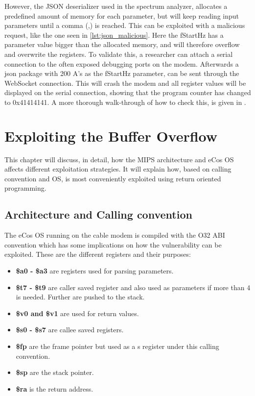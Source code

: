 However, the JSON deserializer used in the spectrum analyzer, allocates a predefined amount of memory for each parameter, but will keep reading input parameters until a comma (,) is reached.
This can be exploited with a malicious request, like the one seen in \cref{lst:json_malicious}.
Here the fStartHz has a parameter value bigger than the allocated memory, and will therefore overflow and overwrite the registers.
To validate this, a researcher can attach a serial connection to the often exposed debugging ports on the modem. 
Afterwards a json package with 200 A's as the fStartHz parameter, can be sent through the WebSocket connection.
This will crash the modem and all register values will be displayed on the serial connection, showing that the program counter has changed to 0x41414141.
A more thorough walk-through of how to check this, is given in .




\chapter{Exploiting the Buffer Overflow}
This chapter will discuss, in detail, how the MIPS architecture and eCos OS affects different exploitation strategies. It will explain how, based on calling convention and OS, \exploitname{} is most conveniently exploited using return oriented programming.

\section{Architecture and Calling convention}
The eCos OS running on the cable modem is compiled with the O32 ABI convention which has some implications on how the vulnerability can be exploited. These are the different registers and their purposes:

\begin{itemize}
    \item \textbf{\$a0 - \$a3} are registers used for parsing parameters.
    \item \textbf{\$t7 - \$t9} are caller saved register and also used as parameters if more than 4 is needed. Further are pushed to the stack.
    \item \textbf{\$v0 and \$v1} are used for return values.
    \item \textbf{\$s0 - \$s7} are callee saved registers.
    \item \textbf{\$fp} are the frame pointer but used as a s register under this calling convention.
    \item \textbf{\$sp} are the stack pointer.
    \item \textbf{\$ra} is the return address.   
\end{itemize}

